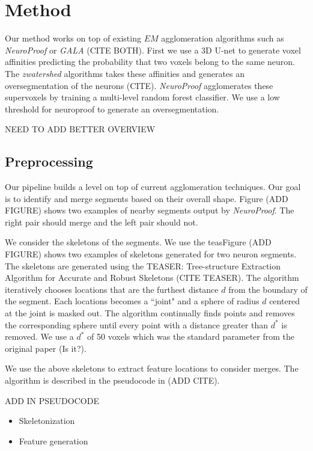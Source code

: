 \section{Method}

Our method works on top of existing $EM$ agglomeration algorithms such as \textit{NeuroProof} or \textit{GALA} (CITE BOTH). First we use a 3D U-net to generate voxel affinities predicting the probability that two voxels belong to the same neuron. The \textit{zwatershed} algorithms takes these affinities and generates an oversegmentation of the neurons (CITE). \textit{NeuroProof} agglomerates these supervoxels by training a multi-level random forest classifier. We use a low threshold for neuroproof to generate an oversegmentation. 

NEED TO ADD BETTER OVERVIEW

\subsection{Preprocessing}

Our pipeline builds a level on top of current agglomeration techniques. Our goal is to identify and merge segments based on their overall shape. Figure (ADD FIGURE) shows two examples of nearby segments output by \textit{NeuroProof}. The right pair should merge and the left pair should not.  

We consider the skeletons of the segments. We use the teasFigure (ADD FIGURE) shows two examples of skeletons generated for two neuron segments. The skeletons are generated using the TEASER: Tree-structure Extraction Algorithm for Accurate and Robust Skeletons (CITE TEASER). The algorithm iteratively chooses locations that are the furthest distance $d$ from the boundary of the segment. Each locations becomes a ``joint" and a sphere of radius $d$ centered at the joint is masked out. The algorithm continually finds points and removes the corresponding sphere until every point with a distance greater than $d^*$ is removed. We use a $d^*$ of 50 voxels which was the standard parameter from the original paper (Is it?). 

We use the above skeletons to extract feature locations to consider merges. The algorithm is described in the pseudocode in (ADD CITE).

ADD IN PSEUDOCODE

\begin{itemize}
	
	
	
	\item Skeletonization
	\item Feature generation
\end{itemize}

